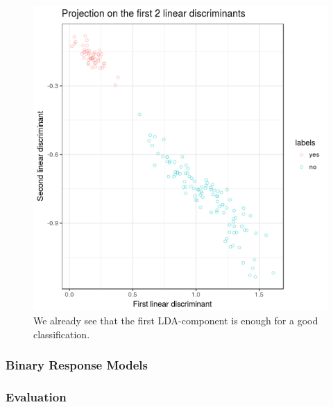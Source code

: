 \documentclass{article}
\begin{document}


\begin{figure}
\label{irisLDA}
\begin{center}
\includegraphics[scale=0.3, trim={10mm 20mm 30mm 30mm}]{../LDA/irisLDA.png}
\end{center}
\caption{We already see that the first LDA-component is enough for a good classification.}
\end{figure}

\subsubsection{Binary Response Models}
\subsubsection{Evaluation}

\newpage
\end{document}
